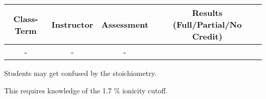 \begin{outcomes}
	\begin{center}
		\begin{tabular}{cccc}
			\hline\hline
                Class-Term & Instructor & Assessment & Results (Full/Partial/No Credit) \\
			\hline
                - & - & - &  \\
			\hline
		\end{tabular}
	\end{center}
\end{outcomes}

\begin{comments}

Students may get confused by the stoichiometry.

This requires knowledge of the 1.7 \% ionicity cutoff.

	
\end{comments}